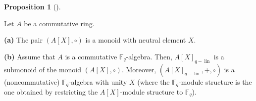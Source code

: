 \documentclass[numbers=enddot,12pt,final,onecolumn,notitlepage]{scrartcl}%
\theoremstyle{definition}
\newtheorem{prop}[theo]{Proposition}
\newenvironment{proposition}[1][]
{\begin{prop}[#1]\begin{leftbar}}
{\end{leftbar}\end{prop}}
\begin{document}
\begin{proposition}
\label{prop.q-pol.comp.basics}Let $A$ be a commutative ring.

\textbf{(a)} The pair $\left(  A\left[  X\right]  ,\circ\right)  $ is a monoid
with neutral element $X$.

\textbf{(b)} Assume that $A$ is a commutative $\mathbb{F}_{q}$-algebra. Then,
$A\left[  X\right]  _{q-\operatorname*{lin}}$ is a submonoid of the monoid
$\left(  A\left[  X\right]  ,\circ\right)  $. Moreover, $\left(  A\left[
X\right]  _{q-\operatorname*{lin}},+,\circ\right)  $ is a (noncommutative)
$\mathbb{F}_{q}$-algebra with unity $X$ (where the $\mathbb{F}_{q}$-module
structure is the one obtained by restricting the $A\left[  X\right]  $-module
structure to $\mathbb{F}_{q}$).
\end{proposition}
\end{document}
